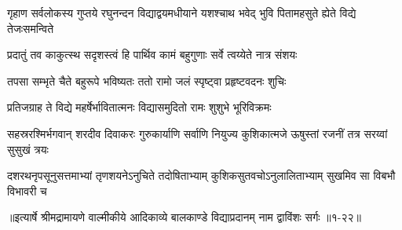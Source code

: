 \threelineshloka
{गृहाण सर्वलोकस्य गुप्तये रघुनन्दन}
{विद्याद्वयमधीयाने यशश्चाथ भवेद् भुवि}
{पितामहसुते ह्येते विद्ये तेजःसमन्विते} %

\twolineshloka
{प्रदातुं तव काकुत्स्थ सदृशस्त्वं हि पार्थिव}
{कामं बहुगुणाः सर्वे त्वय्येते नात्र संशयः} %

\twolineshloka
{तपसा सम्भृते चैते बहुरूपे भविष्यतः}
{ततो रामो जलं स्पृष्ट्वा प्रहृष्टवदनः शुचिः} %

\twolineshloka
{प्रतिजग्राह ते विद्ये महर्षेर्भावितात्मनः}
{विद्यासमुदितो रामः शुशुभे भूरिविक्रमः} %

\threelineshloka
{सहस्ररश्मिर्भगवान् शरदीव दिवाकरः}
{गुरुकार्याणि सर्वाणि नियुज्य कुशिकात्मजे}
{ऊषुस्तां रजनीं तत्र सरय्वां सुसुखं त्रयः} %

\twolineshloka
{दशरथनृपसूनुसत्तमाभ्यां तृणशयनेऽनुचिते तदोषिताभ्याम्}
{कुशिकसुतवचोऽनुलालिताभ्याम् सुखमिव सा विबभौ विभावरी च} %


॥इत्यार्षे श्रीमद्रामायणे वाल्मीकीये आदिकाव्ये बालकाण्डे विद्याप्रदानम् नाम द्वाविंशः सर्गः ॥१-२२॥

